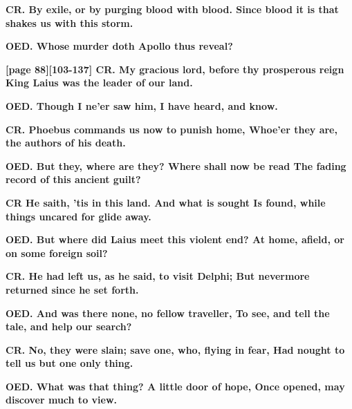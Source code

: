 \documentclass[11pt,letter]{book}
\begin{document}
\par \textbf{CR. By exile, or by purging blood with blood. Since blood it is that shakes us with this storm.}
\par 

\par \textbf{OED. Whose murder doth Apollo thus reveal?}
\par 

\par \textbf{[page 88][103-137] CR. My gracious lord, before thy prosperous reign King Laius was the leader of our land.}
\par 

\par \textbf{OED. Though I ne’er saw him, I have heard, and know.}
\par 

\par \textbf{CR. Phoebus commands us now to punish home, Whoe’er they are, the authors of his death.}
\par 

\par \textbf{OED. But they, where are they? Where shall now be read The fading record of this ancient guilt?}
\par 

\par \textbf{CR He saith, ’tis in this land. And what is sought Is found, while things uncared for glide away.}
\par 

\par \textbf{OED. But where did Laius meet this violent end? At home, afield, or on some foreign soil?}
\par 

\par \textbf{CR. He had left us, as he said, to visit Delphi; But nevermore returned since he set forth.}
\par 

\par \textbf{OED. And was there none, no fellow traveller, To see, and tell the tale, and help our search?}
\par 

\par \textbf{CR. No, they were slain; save one, who, flying in fear, Had nought to tell us but one only thing.}
\par 

\par \textbf{OED. What was that thing? A little door of hope, Once opened, may discover much to view.}
\par 
\end{document}
